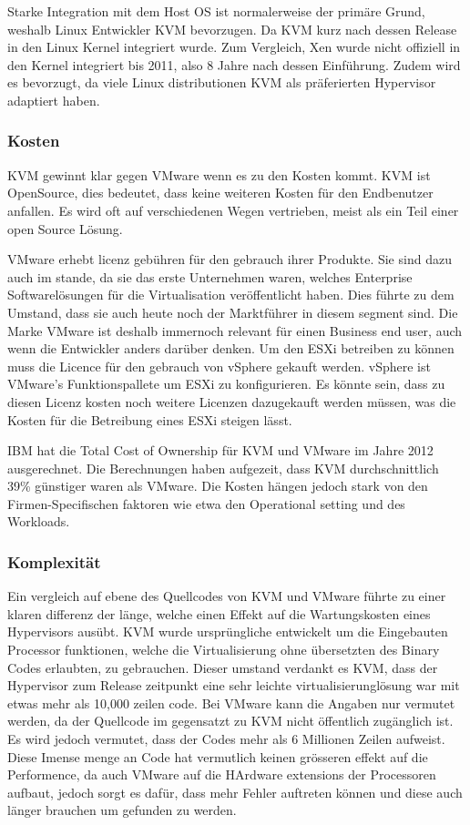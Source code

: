 \documentclass[14pt]{extreport}
\begin{document}
Starke Integration mit dem Host OS ist normalerweise der primäre Grund, weshalb Linux Entwickler KVM bevorzugen. Da KVM kurz nach dessen Release in den Linux Kernel integriert wurde. Zum Vergleich, Xen wurde nicht offiziell in den Kernel integriert bis 2011, also 8 Jahre nach dessen Einführung. Zudem wird es bevorzugt, da viele Linux distributionen KVM als präferierten Hypervisor adaptiert haben. \cite{website:vergleich}

\subsubsection{Kosten}

KVM gewinnt klar gegen VMware wenn es zu den Kosten kommt. KVM ist OpenSource, dies bedeutet, dass keine weiteren Kosten für den Endbenutzer anfallen. Es wird oft auf verschiedenen Wegen vertrieben, meist als ein Teil einer open Source Lösung.

VMware erhebt licenz gebühren für den gebrauch ihrer Produkte. Sie sind dazu auch im stande, da sie das erste Unternehmen waren, welches Enterprise Softwarelösungen für die Virtualisation veröffentlicht haben. Dies führte zu dem Umstand, dass sie auch heute noch der Marktführer in diesem segment sind. Die Marke VMware ist deshalb immernoch relevant für einen Business end user, auch wenn die Entwickler anders darüber denken. Um den ESXi betreiben zu können muss die Licence für den gebrauch von vSphere gekauft werden. vSphere ist VMware's Funktionspallete um ESXi zu konfigurieren. Es könnte sein, dass zu diesen Licenz kosten noch weitere Licenzen dazugekauft werden müssen, was die Kosten für die Betreibung eines ESXi steigen lässt.

IBM hat die Total Cost of Ownership für KVM und VMware im Jahre 2012 ausgerechnet. Die Berechnungen haben aufgezeit, dass KVM durchschnittlich 39\% günstiger waren als VMware. Die Kosten hängen jedoch stark von den Firmen-Specifischen faktoren wie etwa den Operational setting und des Workloads. \cite{website:vergleich}

\subsubsection{Komplexität}

Ein vergleich auf ebene des Quellcodes von KVM und VMware führte zu einer klaren differenz der länge, welche einen Effekt auf die Wartungskosten eines Hypervisors ausübt. KVM wurde ursprüngliche entwickelt um die Eingebauten Processor funktionen, welche die Virtualisierung ohne übersetzten des Binary Codes erlaubten, zu gebrauchen. Dieser umstand verdankt es KVM, dass der Hypervisor zum Release zeitpunkt eine sehr leichte virtualisierunglösung war mit etwas mehr als 10,000 zeilen code.
Bei VMware kann die Angaben nur vermutet werden, da der Quellcode im gegensatzt zu KVM nicht öffentlich zugänglich ist. Es wird jedoch vermutet, dass der Codes mehr als 6 Millionen Zeilen aufweist. Diese Imense menge an Code hat vermutlich keinen grösseren effekt auf die Performence, da auch VMware auf die HArdware extensions der Processoren aufbaut, jedoch sorgt es dafür, dass mehr Fehler auftreten können und diese auch länger brauchen um gefunden zu werden. \cite{website:vergleich}
\end{document}
